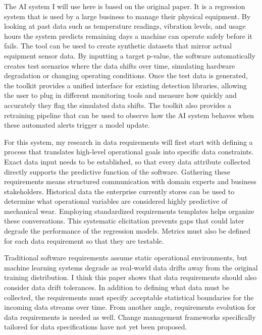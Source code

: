 The AI system I will use here is based on the original paper. It is a regression system that is used by a large business to manage their physical equipment. By looking at past data such as temperature readings, vibration levels, and usage hours the system predicts remaining days a machine can operate safely before it fails. The tool can be used to create synthetic datasets that mirror actual equipment sensor data. By inputting a target p-value, the software automatically creates test scenarios where the data shifts over time, simulating hardware degradation or changing operating conditions. Once the test data is generated, the toolkit provides a unified interface for existing detection libraries, allowing the user to plug in different monitoring tools and measure how quickly and accurately they flag the simulated data shifts. The toolkit also provides a retraining pipeline that can be used to observe how the AI system behaves when these automated alerts trigger a model update. 

For this system, my research in data requirements will first start with defining a process that translates high-level operational goals into specific data constraints. Exact data input needs to be established, so that every data attribute collected directly supports the predictive function of the software. Gathering these requirements means structured communication with domain experts and business stakeholders. Historical data the enterprise currently stores can be used to determine what operational variables are considered highly predictive of mechanical wear. Employing standardized requirements templates helps organize these conversations. This systematic elicitation prevents gaps that could later degrade the performance of the regression models. Metrics must also be defined for each data requirement so that they are testable.

Traditional software requirements assume static operational environments, but machine learning systems degrade as real-world data drifts away from the original training distribution. I think this paper shows that data requirements should also consider data drift tolerances. In addition to defining what data must be collected, the requirements must specify acceptable statistical boundaries for the incoming data streams over time. From another angle, requirements evolution for data requirements is needed as well. Change management frameworks specifically tailored for data specifications have not yet been proposed. 

